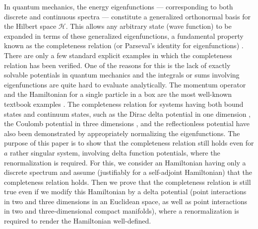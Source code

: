 \documentclass[amsmath,amssymb,14pt]{article}
\numberwithin{equation}{section}
\begin{document}
In quantum mechanics, the energy eigenfunctions — corresponding to both discrete and continuous spectra — constitute a generalized orthonormal basis for the Hilbert space $\mathcal{H}$. This allows any arbitrary state (wave function) to be expanded in terms of these generalized eigenfunctions, a fundamental property known as the completeness relation (or Parseval’s identity for eigenfunctions) \cite{Arnobook, GalindoPascual1, Berezanskii}. There are only a few standard explicit examples in which the completeness relation has been verified. One of the reasons for this is the lack of exactly solvable potentials in quantum mechanics and the integrals or sums involving eigenfunctions are quite hard to evaluate analytically. The momentum operator and the Hamiltonian for a single particle in a box are the most well-known textbook examples \cite{Griffiths, Gasiorowicz}. The completeness relation for systems having both bound states and continuum states, such as the Dirac delta potential in one dimension \cite{Brownstein, Patil, Dalabeeh}, the Coulomb potential in three dimensions \cite{Mukunda}, and the reflectionless potential \cite{reflectionless} have also been demonstrated by appropriately normalizing the eigenfunctions. The purpose of this paper is to show that the completeness relation still holds even for $a$ rather singular system, involving delta function potentials, where the renormalization is required. For this, we consider an Hamiltonian having only a discrete spectrum and assume (justifiably for a self-adjoint Hamiltonian) that the completeness relation holds. Then we prove that the completeness relation is still true even if we modify this Hamiltonian by a delta potential (point interactions in two and three dimensions in an Euclidean space, as well as point interactions in two and three-dimensional compact manifolds), where a renormalization is required to render the Hamiltonian well-defined. 
\end{document}
